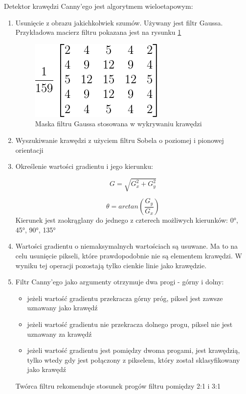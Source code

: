 Detektor krawędzi Canny'ego jest algorytmem wieloetapowym:
\begin{enumerate}
\item Usunięcie z obrazu jakichkolwiek szumów. Używany jest filtr Gaussa. Przykładowa macierz filtru pokazana jest na rysunku \ref{fig:canny_gauss}
\begin{figure}[h]
\centering
\includegraphics[scale=0.8]{img/canny_gauss.png}
\caption{Maska filtru Gaussa stosowana w wykrywaniu krawędzi}
\label{fig:canny_gauss}
\end{figure}
\item Wyszukiwanie krawędzi z użyciem filtru Sobela o poziomej i pionowej orientacji
\item Określenie wartości gradientu i jego kierunku:

\begin{equation}
G=\sqrt{G_x^2+G_y^2}
\end{equation}

\begin{equation}
\theta=arctan(\frac{G_y}{G_x})
\end{equation}
Kierunek jest zaokrąglany do jednego z czterech możliwych kierunków: \ang{0}, \ang{45}, \ang{90}, \ang{135}

\item Wartości gradientu o niemaksymalnych wartościach są usuwane. Ma to na celu usunięcie pikseli, które prawdopodobnie nie są elementem krawędzi. W wyniku tej operacji pozostają tylko cienkie linie jako krawędzie.

\item Filtr Canny'ego jako argumenty otrzymuje dwa progi - górny i dolny:
\begin{itemize}
\item jeżeli wartość gradientu przekracza górny próg, piksel jest zawsze uznawany jako krawędź
\item jeżeli wartość gradientu nie przekracza dolnego progu, piksel nie jest uznawany za krawędź
\item jeżeli wartość gradientu jest pomiędzy dwoma progami, jest krawędzią, tylko wtedy gdy jest połączony z pikselem, który został sklasyfikowany jako krawędź
\end{itemize}
Twórca filtru rekomenduje stosunek progów filtru pomiędzy 2:1 i 3:1
\end{enumerate}